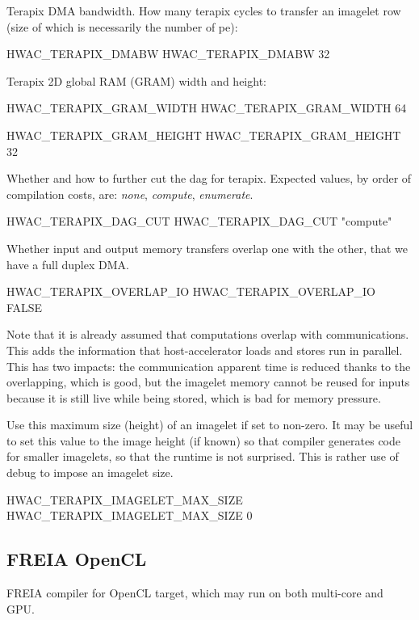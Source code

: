 \documentclass[a4paper]{report}
\begin{document}
Terapix DMA bandwidth. How many terapix cycles to transfer an imagelet row
(size of which is necessarily the number of pe):
\begin{PipsProp}{HWAC_TERAPIX_DMABW}
HWAC_TERAPIX_DMABW 32
\end{PipsProp}

Terapix 2D global RAM (GRAM) width and height:
\begin{PipsProp}{HWAC_TERAPIX_GRAM_WIDTH}
HWAC_TERAPIX_GRAM_WIDTH 64
\end{PipsProp}
\begin{PipsProp}{HWAC_TERAPIX_GRAM_HEIGHT}
HWAC_TERAPIX_GRAM_HEIGHT 32
\end{PipsProp}

Whether and how to further cut the dag for terapix.
Expected values, by order of compilation costs, are:
\emph{none}, \emph{compute}, \emph{enumerate}.
\begin{PipsProp}{HWAC_TERAPIX_DAG_CUT}
HWAC_TERAPIX_DAG_CUT "compute"
\end{PipsProp}

Whether input and output memory transfers overlap one with the other,
that we have a full duplex DMA.
\begin{PipsProp}{HWAC_TERAPIX_OVERLAP_IO}
HWAC_TERAPIX_OVERLAP_IO FALSE
\end{PipsProp}
Note that it is already assumed that computations overlap with
communications. This adds the information that host-accelerator
loads and stores run in parallel. This has two impacts: the
communication apparent time is reduced thanks to the overlapping,
which is good, but the imagelet memory cannot be reused for inputs
because it is still live while being stored, which is bad for
memory pressure.

Use this maximum size (height) of an imagelet if set to non-zero.
It may be useful to set this value to the image height (if known) so
that compiler generates code for smaller imagelets, so that the
runtime is not surprised. This is rather use of debug to impose
an imagelet size.
\begin{PipsProp}{HWAC_TERAPIX_IMAGELET_MAX_SIZE}
HWAC_TERAPIX_IMAGELET_MAX_SIZE 0
\end{PipsProp}

\subsection{FREIA OpenCL}
\label{hwac-freia-opencl}

FREIA compiler for OpenCL target, which may run on both multi-core and GPU.
\end{document}
